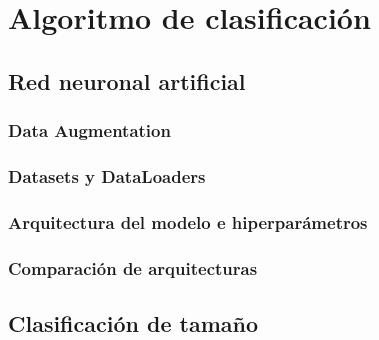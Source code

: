 \newpage
\chapter{Algoritmo de clasificación}

	\section{Red neuronal artificial}

		\subsection{Data Augmentation}

		\subsection{Datasets y DataLoaders}

		\subsection{Arquitectura del modelo e hiperparámetros}
		
		\subsection{Comparación de arquitecturas}
		
	\section{Clasificación de tamaño}
	

	















